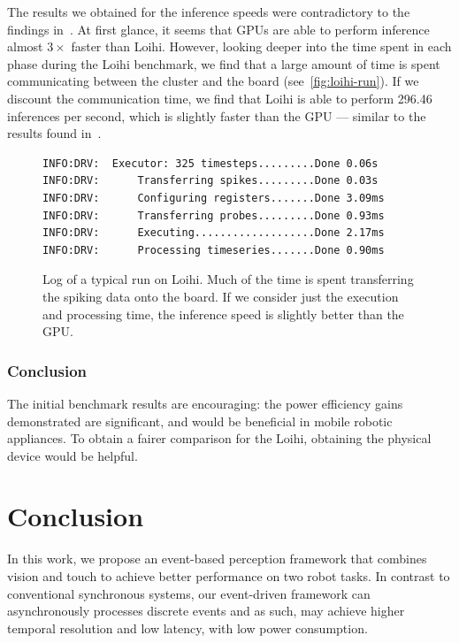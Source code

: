 \documentclass[fyp]{socreport}
\begin{document}
The results we obtained for the inference speeds were contradictory to the
findings in~\cite{blouw18_bench_keywor_spott_effic_neurom_hardw}. At first
glance, it seems that GPUs are able to perform inference almost $3\times$ faster
than Loihi. However, looking deeper into the time spent in each phase during the
Loihi benchmark, we find that a large amount of time is spent communicating
between the cluster and the board (see~\autoref{fig:loihi-run}). If we
discount the communication time, we find that Loihi is able to perform 296.46
inferences per second, which is slightly faster than the GPU --- similar to the
results found in~\cite{blouw18_bench_keywor_spott_effic_neurom_hardw}.

\begin{figure}
\begin{verbatim}
INFO:DRV:  Executor: 325 timesteps.........Done 0.06s
INFO:DRV:      Transferring spikes.........Done 0.03s
INFO:DRV:      Configuring registers.......Done 3.09ms
INFO:DRV:      Transferring probes.........Done 0.93ms
INFO:DRV:      Executing...................Done 2.17ms
INFO:DRV:      Processing timeseries.......Done 0.90ms
\end{verbatim}
  \caption{Log of a typical run on Loihi. Much of the time is spent transferring
    the spiking data onto the board. If we consider just the execution and
    processing time, the inference speed is slightly better than the GPU.\label{fig:loihi-run}}
\end{figure}

\subsection{Conclusion}

The initial benchmark results are encouraging: the power efficiency gains
demonstrated are significant, and would be beneficial in mobile robotic
appliances. To obtain a fairer comparison for the Loihi, obtaining the physical
device would be helpful.

\chapter{Conclusion\label{cha:conclusion}}

In this work, we propose an event-based perception framework that combines
vision and touch to achieve better performance on two robot tasks. In contrast
to conventional synchronous systems, our event-driven framework can
asynchronously processes discrete events and as such, may achieve higher
temporal resolution and low latency, with low power consumption.
\end{document}
